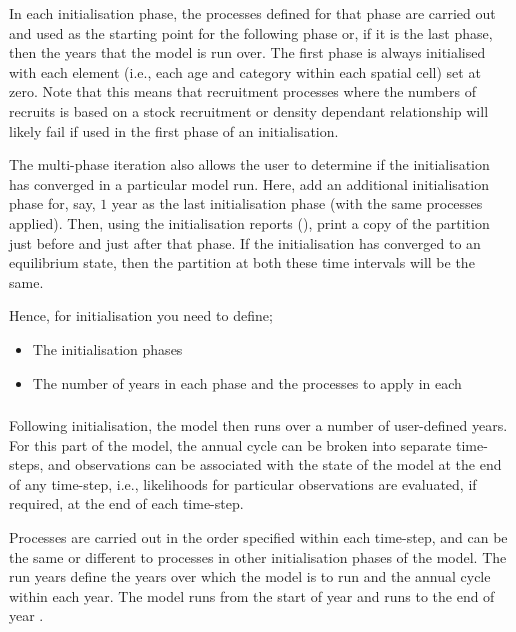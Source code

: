 In each initialisation phase, the processes defined for that phase are carried out and used as the starting point for the following phase or, if it is the last phase, then the years that the model is run over. The first phase is always initialised with each element (i.e., each age and category within each spatial cell) set at zero. Note that this means that recruitment processes where the numbers of recruits is based on a stock recruitment or density dependant relationship will likely fail if used in the first phase of an initialisation. 

The multi-phase iteration also allows the user to determine if the initialisation has converged in a particular model run. Here, add an additional initialisation phase for, say, $1$ year as the last initialisation phase (with the same processes applied). Then, using the initialisation reports (), print a copy of the partition just before and just after that phase. If the initialisation has converged to an equilibrium state, then the partition at both these time intervals will be the same.

Hence, for initialisation you need to define;
\begin{itemize}
  \item The initialisation phases
  \item The number of years in each phase and the processes to apply in each
\end{itemize}

\subsubsection{}

Following initialisation, the model then runs over a number of user-defined years. For this part of the model, the annual cycle can be broken into separate time-steps, and observations can be associated with the state of the model at the end of any time-step, i.e., likelihoods for particular observations are evaluated, if required, at the end of each time-step. 

Processes are carried out in the order specified within each time-step, and can be the same or different to processes in other initialisation phases of the model. The run years define the years over which the model is to run and the annual cycle within each year. The model runs from the start of year  and runs to the end of year . %

